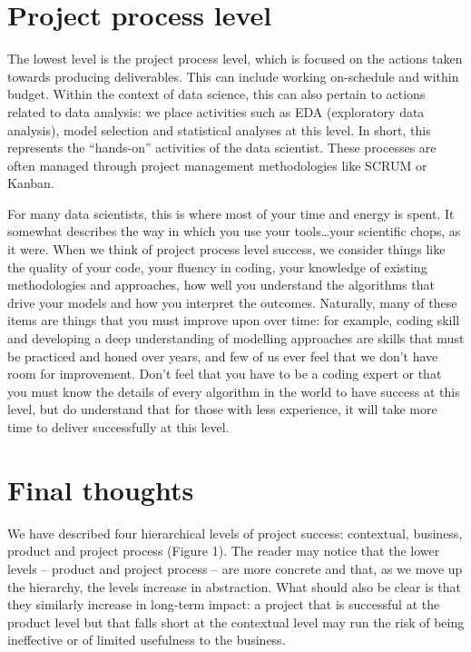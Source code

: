 \documentclass[
]{book}
\begin{document}
\hypertarget{project-process-level}{%
\section{Project process level}\label{project-process-level}}

The lowest level is the project process level, which is focused on the actions taken towards producing deliverables. This can include working on-schedule and within budget. Within the context of data science, this can also pertain to actions related to data analysis: we place activities such as EDA (exploratory data analysis), model selection and statistical analyses at this level. In short, this represents the ``hands-on'' activities of the data scientist. These processes are often managed through project management methodologies like SCRUM or Kanban.

For many data scientists, this is where most of your time and energy is spent. It somewhat describes the way in which you use your tools\ldots your scientific chops, as it were. When we think of project process level success, we consider things like the quality of your code, your fluency in coding, your knowledge of existing methodologies and approaches, how well you understand the algorithms that drive your models and how you interpret the outcomes. Naturally, many of these items are things that you must improve upon over time: for example, coding skill and developing a deep understanding of modelling approaches are skills that must be practiced and honed over years, and few of us ever feel that we don't have room for improvement. Don't feel that you have to be a coding expert or that you must know the details of every algorithm in the world to have success at this level, but do understand that for those with less experience, it will take more time to deliver successfully at this level.

\hypertarget{final-thoughts}{%
\section{Final thoughts}\label{final-thoughts}}

We have described four hierarchical levels of project success: contextual, business, product and project process (Figure 1). The reader may notice that the lower levels -- product and project process -- are more concrete and that, as we move up the hierarchy, the levels increase in abstraction. What should also be clear is that they similarly increase in long-term impact: a project that is successful at the product level but that falls short at the contextual level may run the risk of being ineffective or of limited usefulness to the business.
\end{document}

